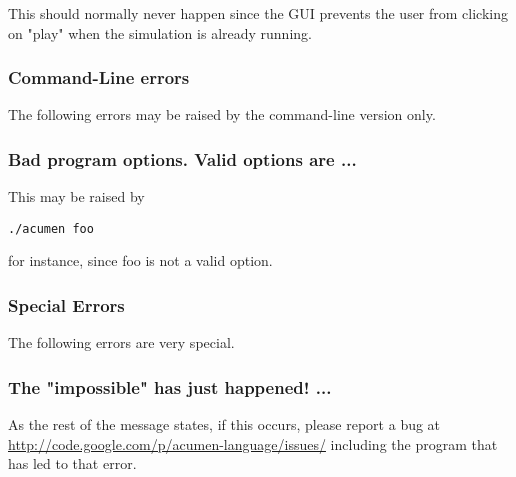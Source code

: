 This should normally never happen since the GUI prevents the user from clicking on "play" when the simulation is already running.
\subsubsection{Command-Line errors}

The following errors may be raised by the command-line version only.
\subsubsection{Bad program options. Valid options are ...}

This may be raised by
%
\begin{lstlisting}
./acumen foo 
\end{lstlisting}
%
for instance, since foo is not a valid option.
\subsubsection{Special Errors}

The following errors are very special.
\subsubsection{The "impossible" has just happened! ...}

As the rest of the message states, if this occurs, please report a bug at \url{http://code.google.com/p/acumen-language/issues/} including the program that has led to that error. 
